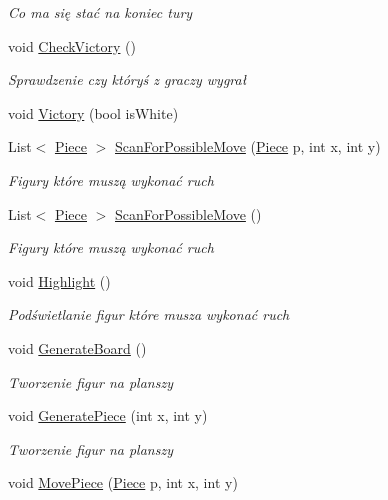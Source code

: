 \begin{DoxyCompactItemize}
\begin{DoxyCompactList}\small\item\em Co ma się stać na koniec tury \end{DoxyCompactList}\item 
void \mbox{\hyperlink{class_checkers_board_ac148b117df6e0d374ff9a35b0e0854d2}{Check\+Victory}} ()
\begin{DoxyCompactList}\small\item\em Sprawdzenie czy któryś z graczy wygrał \end{DoxyCompactList}\item 
void \mbox{\hyperlink{class_checkers_board_aa4fb3184676cf22bd5958b6484e86c34}{Victory}} (bool is\+White)
\item 
List$<$ \mbox{\hyperlink{class_piece}{Piece}} $>$ \mbox{\hyperlink{class_checkers_board_ad2c9c13a174af762f34a411fc290d02a}{Scan\+For\+Possible\+Move}} (\mbox{\hyperlink{class_piece}{Piece}} p, int x, int y)
\begin{DoxyCompactList}\small\item\em Figury które muszą wykonać ruch \end{DoxyCompactList}\item 
List$<$ \mbox{\hyperlink{class_piece}{Piece}} $>$ \mbox{\hyperlink{class_checkers_board_a913e746f1d4f5091851dbe0d887ec2a5}{Scan\+For\+Possible\+Move}} ()
\begin{DoxyCompactList}\small\item\em Figury które muszą wykonać ruch \end{DoxyCompactList}\item 
void \mbox{\hyperlink{class_checkers_board_a7b684b257525287c52741b1e6d2ae30a}{Highlight}} ()
\begin{DoxyCompactList}\small\item\em Podświetlanie figur które musza wykonać ruch \end{DoxyCompactList}\item 
void \mbox{\hyperlink{class_checkers_board_acc289a7520fabb912525ef2a417a6e14}{Generate\+Board}} ()
\begin{DoxyCompactList}\small\item\em Tworzenie figur na planszy \end{DoxyCompactList}\item 
void \mbox{\hyperlink{class_checkers_board_aea3617cd6463f7b4d01ab8688ecec3ad}{Generate\+Piece}} (int x, int y)
\begin{DoxyCompactList}\small\item\em Tworzenie figur na planszy \end{DoxyCompactList}\item 
void \mbox{\hyperlink{class_checkers_board_abdc45f3ba65e875a4e7a6d751014c1ee}{Move\+Piece}} (\mbox{\hyperlink{class_piece}{Piece}} p, int x, int y)
\end{DoxyCompactItemize}
